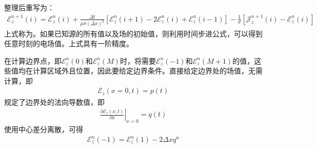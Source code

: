 \documentclass{article}
\numberwithin{equation}{section}
\begin{document}
整理后重写为：
\begin{align}
    \label{eq:eq530}
    \mathcal{E}_z^{n+1}(i)=\mathcal{E}_z^{n}(i)+\frac{\Delta t}{\mu\sigma(\Delta x)^2}\left[\mathcal{E}_z^{n}(i+1)-2\mathcal{E}_z^{n}(i)+\mathcal{E}_z^{n}(i-1)\right]-\frac{1}{\sigma}\left[\mathcal{J}_z^{n+1}(i)-\mathcal{E}_z^{n}(i)\right]
\end{align}
上式称为\textbf{\color{blue}{时间步进公式}}。如果已知源的所有值以及场的初始值，则利用时间步进公式，可以得到任意时刻的电场值。上式具有一阶精度。\par
在计算边界点，即$\mathcal{E}_z^{n}(0)$和$\mathcal{E}_z^{n}(M)$时，将需要$\mathcal{E}_z^{n}(-1)$和$\mathcal{E}_z^{n}(M+1)$的值，这些值均在计算区域外且位置，因此要给定边界条件。\textbf{\color{blue}{Dirichlet条件}}直接给定边界处的场值，无需计算，即
\begin{align}
    \label{eq:eq533}
    \mathcal{E}_z(x=0,t)=p(t)
\end{align}
\textbf{\color{blue}{Neumann条件}}规定了边界处的法向导数值，即
\begin{align}
    \label{eq:eq531}
    \left.\frac{\partial \mathcal{E}_z(x,t)}{\partial x}\right|_{x=0}=q(t)
\end{align}
使用中心差分离散，可得
\begin{align}
    \label{eq:eq532}
    \mathcal{E}_z^{n}(-1)=\mathcal{E}_z^{n}(1)-2\Delta xq^n
\end{align}
\end{document}
